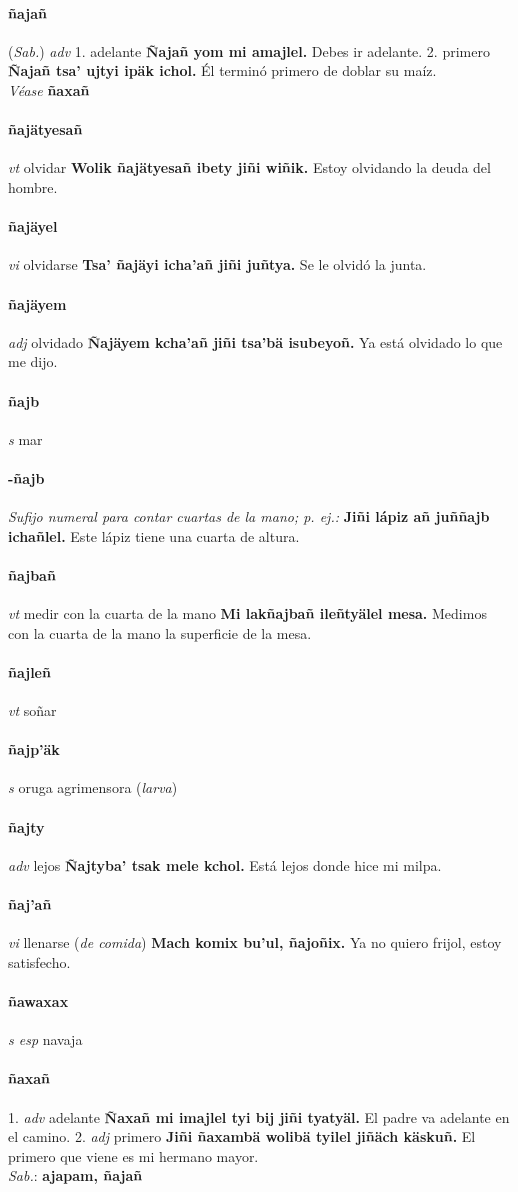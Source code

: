 \documentclass{scrbook}
\newcommand{\entry}[1]{\paragraph{#1}}
\newcommand{\onedefinition}[1]{#1.}
\newcommand{\nontranslationdef}[1]{\textit{#1}}
\newcommand{\partofspeech}[1]{\textit{#1}}
\newcommand{\spanishtranslation}[1]{#1}
\newcommand{\clarification}[1]{(\textit{#1})}
\newcommand{\cholexample}[1]{\textbf{#1}}
\newcommand{\exampletranslation}[1]{#1}
\newcommand{\dialectvariant}[1]{\\\textit{#1}:}
\newcommand{\dialectword}[1]{\textbf{#1}}
\newcommand{\alsosee}[1]{\\\textit{Véase} \textbf{#1}}
\newcommand{\relevantdialect}[1]{(\textit{#1})}
\begin{document}
\begin{multicols}{2}
\entry{ñajañ}
\relevantdialect{Sab.}
\partofspeech{adv}
\onedefinition{1}
\spanishtranslation{adelante}
\cholexample{Ñajañ yom mi amajlel.}
\exampletranslation{Debes ir adelante.}
\onedefinition{2}
\spanishtranslation{primero}
\cholexample{Ñajañ tsa' ujtyi ipäk ichol.}
\exampletranslation{Él terminó primero de doblar su maíz.}
\alsosee{ñaxañ}

\entry{ñajätyesañ}
\partofspeech{vt}
\spanishtranslation{olvidar}
\cholexample{Wolik ñajätyesañ ibety jiñi wiñik.}
\exampletranslation{Estoy olvidando la deuda del hombre.}

\entry{ñajäyel}
\partofspeech{vi}
\spanishtranslation{olvidarse}
\cholexample{Tsa' ñajäyi icha'añ jiñi juñtya.}
\exampletranslation{Se le olvidó la junta.}

\entry{ñajäyem}
\partofspeech{adj}
\spanishtranslation{olvidado}
\cholexample{Ñajäyem kcha'añ jiñi tsa'bä isubeyoñ.}
\exampletranslation{Ya está olvidado lo que me dijo.}

\entry{ñajb}
\partofspeech{s}
\spanishtranslation{mar}

\entry{-ñajb}
\nontranslationdef{Sufijo numeral para contar cuartas de la mano; p. ej.:}
\cholexample{Jiñi lápiz añ juññajb ichañlel.}
\exampletranslation{Este lápiz tiene una cuarta de altura.}

\entry{ñajbañ}
\partofspeech{vt}
\spanishtranslation{medir con la cuarta de la mano}
\cholexample{Mi lakñajbañ ileñtyälel mesa.}
\exampletranslation{Medimos con la cuarta de la mano la superficie de la mesa.}

\entry{ñajleñ}
\partofspeech{vt}
\spanishtranslation{soñar}

\entry{ñajp'äk}
\partofspeech{s}
\spanishtranslation{oruga agrimensora}
\clarification{larva}

\entry{ñajty}
\partofspeech{adv}
\spanishtranslation{lejos}
\cholexample{Ñajtyba' tsak mele kchol.}
\exampletranslation{Está lejos donde hice mi milpa.}

\entry{ñaj'añ}
\partofspeech{vi}
\spanishtranslation{llenarse}
\clarification{de comida}
\cholexample{Mach komix bu'ul, ñajoñix.}
\exampletranslation{Ya no quiero frijol, estoy satisfecho.}

\entry{ñawaxax}
\partofspeech{s esp}
\spanishtranslation{navaja}

\entry{ñaxañ}
\onedefinition{1}
\partofspeech{adv}
\spanishtranslation{adelante}
\cholexample{Ñaxañ mi imajlel tyi bij jiñi tyatyäl.}
\exampletranslation{El padre va adelante en el camino.}
\onedefinition{2}
\partofspeech{adj}
\spanishtranslation{primero}
\cholexample{Jiñi ñaxambä wolibä tyilel jiñäch käskuñ.}
\exampletranslation{El primero que viene es mi hermano mayor.}
\dialectvariant{Sab.}
\dialectword{ajapam, ñajañ}


\end{multicols}
\end{document}

